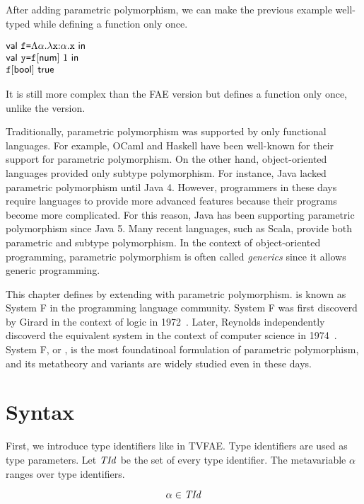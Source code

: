 After adding parametric polymorphism, we can make the previous example well-typed
while defining a function only once.

$
  \begin{array}{@{}l}
    \ebind{\cf}{\etfun{\alpha}{\efunt{\cx}{\alpha}{\cx}}}{\\
    \ebind{\cy}{\etapp{\cf}{\tnum}\ 1}{\\
    \etapp{\cf}{\tbool}\ \textsf{true}
    }}
  \end{array}
$

It is still more complex than the \textsf{FAE} version but defines a function
only once, unlike the \plang version.

Traditionally, parametric polymorphism was supported by only functional
languages. For example, OCaml and Haskell have been well-known for their support for
parametric polymorphism. On the other hand, object-oriented languages
provided only subtype polymorphism. For instance, Java lacked parametric
polymorphism until Java 4. However, programmers in these days require languages
to provide more advanced features because their programs become more
complicated. For this reason, Java has been supporting parametric polymorphism
since Java 5. Many recent languages, such as Scala, provide both parametric and
subtype polymorphism. In the context of object-oriented programming, parametric
polymorphism is often called \textit{generics} since it allows
generic programming.

This chapter defines \lang by extending \plang with parametric polymorphism.
\lang is known as System F in the programming language community. System F was
first discoverd by Girard in the context of logic in
1972~\cite{girard1972interpretation}. Later, Reynolds independently discoverd
the equivalent system in the context of computer science in
1974~\cite{reynolds1974towards}. System F, or \lang, is the most foundatinoal
formulation of parametric polymorphism, and its metatheory and variants are
widely studied even in these days.

\section{Syntax}

First, we introduce type identifiers like in \textsf{TVFAE}. Type identifiers
are used as type parameters. Let $\mbox{\emph{TId}}$ be the set of every type identifier.
The metavariable $\alpha$ ranges over type identifiers.

\[ \alpha \in \mbox{\emph{TId}} \]

